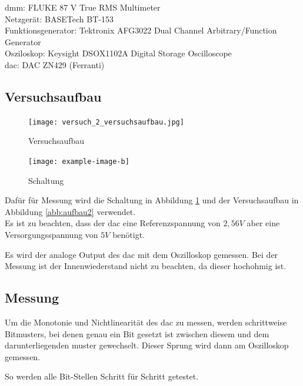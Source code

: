 \documentclass[12pt, a4paper, ngerman]{article}
\begin{document}
\acl{dmm}: FLUKE 87 V True RMS Multimeter \\
Netzgerät: BASETech BT-153 \\
Funktionsgenerator: Tektronix AFG3022 Dual Channel Arbitrary/Function Generator \\
Osziloskop: Keysight DSOX1102A Digital Storage Oscilloscope \\
\ac{dac}: DAC ZN429 (Ferranti)

\subsection{Versuchsaufbau}


\begin{figure}%
  \centering
  \begin{minipage}[b]{0.49\textwidth}
    \texttt{[image: versuch\_2\_versuchsaufbau.jpg]}
    \caption{Versuchsaufbau}
    \label{abb:aufbau2}
  \end{minipage}
  \hfill
  \begin{minipage}[b]{0.49\textwidth}
    \texttt{[image: example-image-b]}
    \caption{Schaltung}
    \label{abb:schaltung2}
  \end{minipage}
\end{figure}

Dafür für Messung wird die Schaltung in Abbildung \ref{abb:schaltung2}
und der Versuchsaufbau in Abbildung \ref{abb:aufbau2} verwendet. \\
Es ist zu beachten, dass der \ac{dac} eine Referenzspannung von $2,56V$
aber eine Versorgungsspannung von $5V$ benötigt.

Es wird der analoge Output des \ac{dac} mit dem Oszilloskop gemessen.
Bei der Messung ist der Innenwiederstand nicht zu beachten, da dieser hochohmig ist.

\subsection{Messung}

Um die Monotonie und Nichtlinearität des \ac{dac} zu messen,
werden schrittweise Bitmusters, bei denen genau ein Bit gesetzt ist zwischen diesem und dem darunterliegenden muster gewechselt.
Dieser Sprung wird dann am Oszilloskop gemessen.

So werden alle Bit-Stellen Schritt für Schritt getestet.
\end{document}
